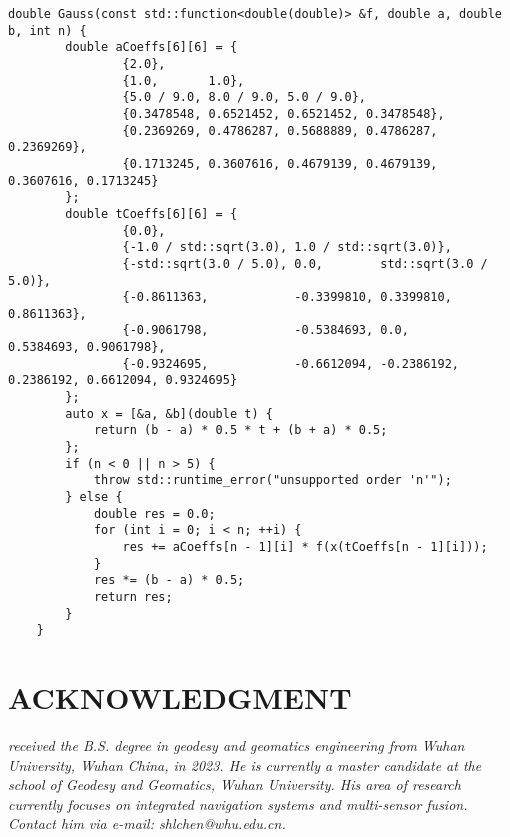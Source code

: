 \documentclass[12pt, onecolumn]{article}
\newcommand\normf{\fangsong}
\begin{document}
	\begin{lstlisting}[caption=\normf Gauss求积]
    double Gauss(const std::function<double(double)> &f, double a, double b, int n) {
        double aCoeffs[6][6] = {
                {2.0},
                {1.0,       1.0},
                {5.0 / 9.0, 8.0 / 9.0, 5.0 / 9.0},
                {0.3478548, 0.6521452, 0.6521452, 0.3478548},
                {0.2369269, 0.4786287, 0.5688889, 0.4786287, 0.2369269},
                {0.1713245, 0.3607616, 0.4679139, 0.4679139, 0.3607616, 0.1713245}
        };
        double tCoeffs[6][6] = {
                {0.0},
                {-1.0 / std::sqrt(3.0), 1.0 / std::sqrt(3.0)},
                {-std::sqrt(3.0 / 5.0), 0.0,        std::sqrt(3.0 / 5.0)},
                {-0.8611363,            -0.3399810, 0.3399810,  0.8611363},
                {-0.9061798,            -0.5384693, 0.0,        0.5384693, 0.9061798},
                {-0.9324695,            -0.6612094, -0.2386192, 0.2386192, 0.6612094, 0.9324695}
        };
        auto x = [&a, &b](double t) {
            return (b - a) * 0.5 * t + (b + a) * 0.5;
        };
        if (n < 0 || n > 5) {
            throw std::runtime_error("unsupported order 'n'");
        } else {
            double res = 0.0;
            for (int i = 0; i < n; ++i) {
                res += aCoeffs[n - 1][i] * f(x(tCoeffs[n - 1][i]));
            }
            res *= (b - a) * 0.5;
            return res;
        }
    }
	\end{lstlisting}
		
	\newpage
	\section*{ACKNOWLEDGMENT}
	\begin{tcolorbox}[colback=white,colframe=white!70!black,title={\bfseries Author Information}]
	\par\noindent
		\parbox[t]{\linewidth}{
	 \noindent{}
	 \emph{
	 received the B.S. degree in geodesy and geomatics engineering from Wuhan University, Wuhan China, in 2023.
	 He is currently a master candidate at the school of Geodesy and Geomatics, Wuhan University. His area of research currently focuses on integrated navigation systems and multi-sensor fusion.
	 Contact him via e-mail: shlchen@whu.edu.cn.
	 }}
	\end{tcolorbox}
		
		
\end{document}
